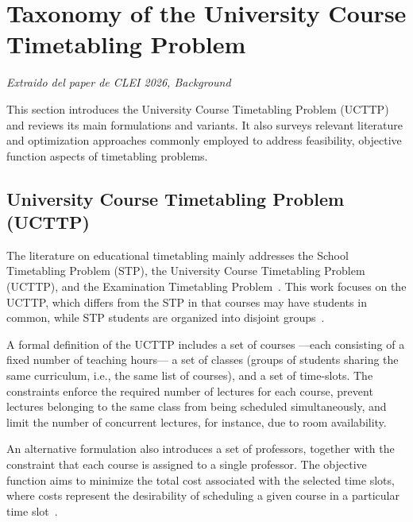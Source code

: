 \section{Taxonomy of the University Course Timetabling Problem}



\textit{Extraido del paper de CLEI 2026, Background}

This section introduces the University Course Timetabling Problem (UCTTP) and reviews its main formulations and variants. It also surveys relevant literature and optimization approaches commonly employed to address feasibility, objective function aspects of timetabling problems.

    \subsection{University Course Timetabling Problem (UCTTP)}\label{sec:UCTTP_definition}


    The literature on educational timetabling mainly addresses the School Timetabling Problem (STP), the University Course Timetabling Problem (UCTTP), and the Examination Timetabling Problem~\cite{babaei2015survey}. This work focuses on the UCTTP, which differs from the STP in that courses may have students in common, while STP students are organized into disjoint groups~\cite{schaerf1999survey}.



    A formal definition of the UCTTP includes a set of courses —each consisting of a fixed number of teaching hours— a set of classes (groups of students sharing the same curriculum, i.e., the same list of courses), and a set of time-slots. The constraints enforce the required number of lectures for each course, prevent lectures belonging to the same class from being scheduled simultaneously, and limit the number of concurrent lectures, for instance, due to room availability.
    
    An alternative formulation also introduces a set of professors, together with the constraint that each course is assigned to a single professor. The objective function aims to minimize the total cost associated with the selected time slots, where costs represent the desirability of scheduling a given course in a particular time slot~\cite{dewerra1985introduction}.

    
